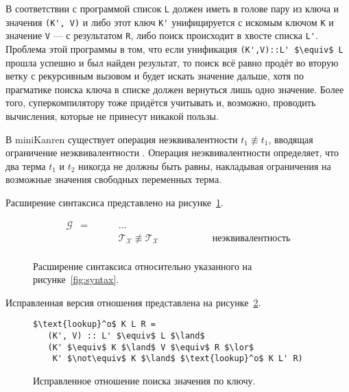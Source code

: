 В соответствии с программой список \lstinline{L} должен иметь в голове пару из ключа и значения \lstinline{(K', V)}
и либо  этот ключ \lstinline{K'} унифицируется с искомым ключом \lstinline{K} и
значение \lstinline{V} --- с результатом \lstinline{R},
либо поиск происходит в хвосте списка \lstinline{L'}. Проблема этой программы в том,
что если унификация \lstinline{(K',V)::L' $\equiv$ L} прошла успешно и был
найден результат, то поиск всё равно продёт во вторую ветку с рекурсивным вызовом и будет
искать значение дальше, хотя по прагматике поиска ключа в списке должен вернуться лишь одно значение.
Более того, суперкомпилятору тоже придётся учитывать и, возможно, проводить вычисления,
которые не принесут никакой пользы.

В miniKanren существует операция неэквивалентности $t_1 \not\equiv t_1$, вводящая
ограничение неэквивалентности \cite{mkConstr}.
Операция неэквивалентности определяет, что два терма $t_1$ и $t_2$ никогда не должны быть равны,
накладывая ограничения на возможные значения свободных переменных терма.

Расширение синтаксиса \ukanren представлено на рисунке~\ref{fig:syntaxExt}.

\begin{figure}[h!]
\centering
\[\begin{array}{ccll}
\mathcal{G}   & = & \hspace{1cm} \dots & \\
              &   & \hspace{1cm} \mathcal{T_X}\not\equiv\mathcal{T_X} \hspace{2cm} &\mbox{неэквивалентность} \\
\end{array}\]
\caption{Расширение синтаксиса \ukanren относительно указанного на рисунке~\ref{fig:syntax}.}
\label{fig:syntaxExt}
\end{figure}

Исправленная версия отношения  представлена на рисунке~\ref{fig:lookupExt}.

\begin{figure}[h!]
\begin{lstlisting}
$\text{lookup}^o$ K L R =
   (K', V) :: L' $\equiv$ L $\land$
   (K' $\equiv$ K $\land$ V $\equiv$ R $\lor$
    K' $\not\equiv$ K $\land$ $\text{lookup}^o$ K L' R)
\end{lstlisting}
\caption{Исправленное отношение поиска значения по ключу.}
\label{fig:lookupExt}
\end{figure}

